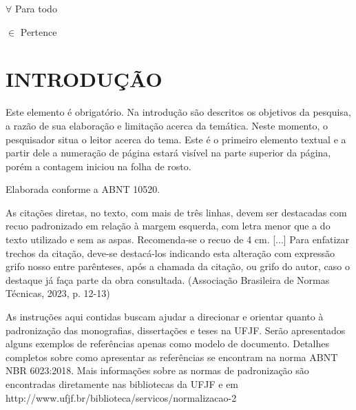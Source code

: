 \documentclass[
  oneside, %
  english,
  brazil
]{abntbibufjf}
\begin{document}
\begin{simbolos}
  \item[\( \forall \)] Para todo
  \item[\( \in \)] Pertence
\end{simbolos}


\tableofcontents*
\cleardoublepage{}



\textual{}

\chapter{INTRODUÇÃO}

Este elemento é obrigatório.
Na introdução são descritos os objetivos da pesquisa, a razão de sua elaboração e limitação acerca da temática.
Neste momento, o pesquisador situa o leitor acerca do tema.
Este é o primeiro elemento textual e a partir dele a numeração de página estará visível na parte superior da página, porém a contagem iniciou na folha de rosto.

Elaborada conforme a ABNT 10520.

\begin{citacao}
  As citações diretas, no texto, com mais de três linhas, devem ser destacadas com recuo padronizado em relação à margem esquerda, com letra menor que a do texto utilizado
  e sem as aspas.
  Recomenda-se o recuo de 4 cm. [...]
  Para enfatizar trechos da citação, deve-se destacá-los indicando esta alteração com expressão grifo nosso entre parênteses, após a chamada da citação, ou grifo do autor, caso o destaque já faça parte da obra consultada. (Associação Brasileira de Normas Técnicas, 2023, p. 12-13)
\end{citacao}

As instruções aqui contidas buscam ajudar a direcionar e orientar quanto à padronização das monografias, dissertações e teses na UFJF\@.
Serão apresentados alguns exemplos de referências apenas como modelo de documento.
Detalhes completos sobre como apresentar as referências se encontram na norma ABNT NBR 6023:2018.
Mais informações sobre as normas de padronização são encontradas diretamente nas bibliotecas da UFJF e em http://www.ufjf.br/biblioteca/servicos/normalizacao-2
\end{document}
